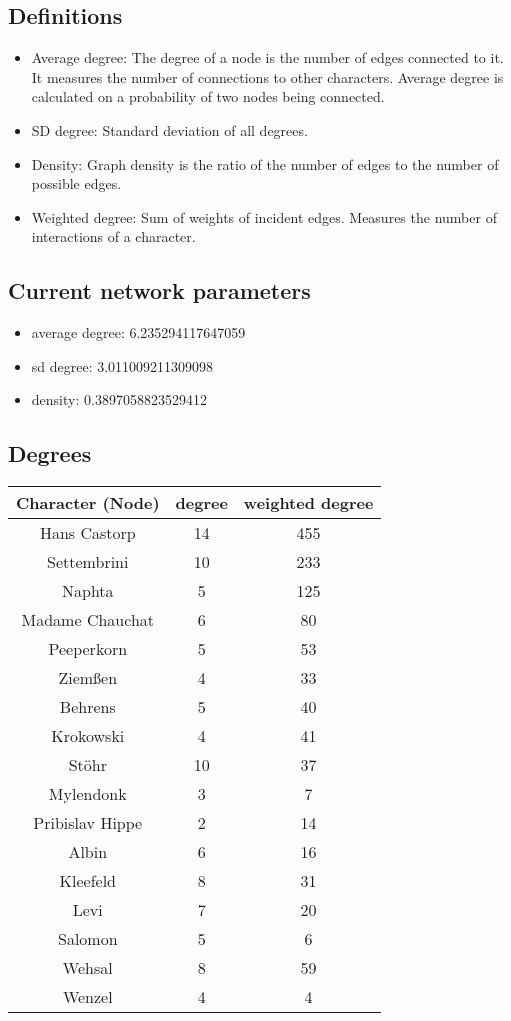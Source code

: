 \documentclass{article}%
\begin{document}
\subsection*{Definitions}%
\begin{itemize}%
\item%
Average degree: The degree of a node is the number of edges connected to it. It measures the number of connections to other characters. Average degree is calculated                        on a probability of two nodes being connected.%
\item%
SD degree: Standard deviation of all degrees.%
\item%
Density: Graph density is the ratio of the number of edges to the number of possible edges.%
\item%
Weighted degree: Sum of weights of incident edges. Measures the number of interactions of a character.%
\end{itemize}

%
\subsection*{Current network parameters}%
\begin{itemize}%
\item%
average degree: 6.235294117647059%
\item%
sd degree: 3.011009211309098%
\item%
density: 0.3897058823529412%
\end{itemize}

%
\subsection*{Degrees}%
\begin{tabular}{|c|c|c|}%
\hline%
Character (Node)&degree&weighted degree\\%
\hline%
Hans Castorp&14&455\\%
\hline%
Settembrini&10&233\\%
\hline%
Naphta&5&125\\%
\hline%
Madame Chauchat&6&80\\%
\hline%
Peeperkorn&5&53\\%
\hline%
Ziemßen&4&33\\%
\hline%
Behrens&5&40\\%
\hline%
Krokowski&4&41\\%
\hline%
Stöhr&10&37\\%
\hline%
Mylendonk&3&7\\%
\hline%
Pribislav Hippe&2&14\\%
\hline%
Albin&6&16\\%
\hline%
Kleefeld&8&31\\%
\hline%
Levi&7&20\\%
\hline%
Salomon&5&6\\%
\hline%
Wehsal&8&59\\%
\hline%
Wenzel&4&4\\%
\hline%
\end{tabular}
\end{document}
